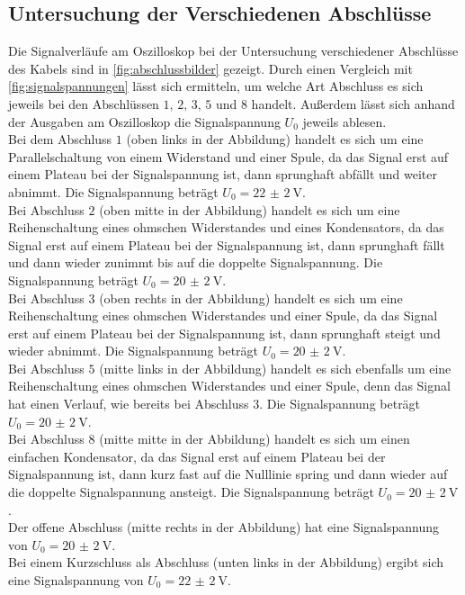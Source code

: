 \subsection{Untersuchung der Verschiedenen Abschlüsse}\label{subsec:abschl}
Die Signalverläufe am Oszilloskop bei der Untersuchung verschiedener Abschlüsse des Kabels sind in \autoref{fig:abschlussbilder} gezeigt. 
Durch einen Vergleich mit \autoref{fig:signalspannungen} lässt sich ermitteln, um welche Art Abschluss es sich jeweils bei den Abschlüssen $1,\, 2,\, 3,\, 5$ und $8$ handelt.
Außerdem lässt sich anhand der Ausgaben am Oszilloskop die Signalspannung $U_0$ jeweils ablesen.
\\
Bei dem Abschluss $1$ (oben links in der Abbildung) handelt es sich um eine Parallelschaltung von einem Widerstand und einer Spule, 
da das Signal erst auf einem Plateau bei der Signalspannung ist, dann sprunghaft abfällt und weiter abnimmt.
Die Signalspannung beträgt $U_0=\qty{22(2)}{\volt}$.
\\
Bei Abschluss $2$ (oben mitte in der Abbildung) handelt es sich um eine Reihenschaltung eines ohmschen Widerstandes und eines Kondensators, 
da das Signal erst auf einem Plateau bei der Signalspannung ist, dann sprunghaft fällt und dann wieder zunimmt bis auf die doppelte Signalspannung.
Die Signalspannung beträgt $U_0=\qty{20(2)}{\volt}$.
\\
Bei Abschluss $3$ (oben rechts in der Abbildung) handelt es sich um eine Reihenschaltung eines ohmschen Widerstandes und einer Spule, 
da das Signal erst auf einem Plateau bei der Signalspannung ist, dann sprunghaft steigt und wieder abnimmt.
Die Signalspannung beträgt $U_0=\qty{20(2)}{\volt}$.
\\
Bei Abschluss $5$ (mitte links in der Abbildung) handelt es sich ebenfalls um eine Reihenschaltung eines ohmschen Widerstandes und einer Spule,
denn das Signal hat einen Verlauf, wie bereits bei Abschluss $3$.
Die Signalspannung beträgt $U_0=\qty{20(2)}{\volt}$.
\\
Bei Abschluss $8$ (mitte mitte in der Abbildung) handelt es sich um einen einfachen Kondensator, 
da das Signal erst auf einem Plateau bei der Signalspannung ist, dann kurz fast auf die Nulllinie spring und dann wieder auf die doppelte Signalspannung ansteigt.
Die Signalspannung beträgt $U_0=\qty{20(2)}{\volt}$.
\\
Der offene Abschluss (mitte rechts in der Abbildung) hat eine Signalspannung von $U_0=\qty{20(2)}{\volt}$.
\\
Bei einem Kurzschluss als Abschluss (unten links in der Abbildung) ergibt sich eine Signalspannung von $U_0=\qty{22(2)}{\volt}$.

